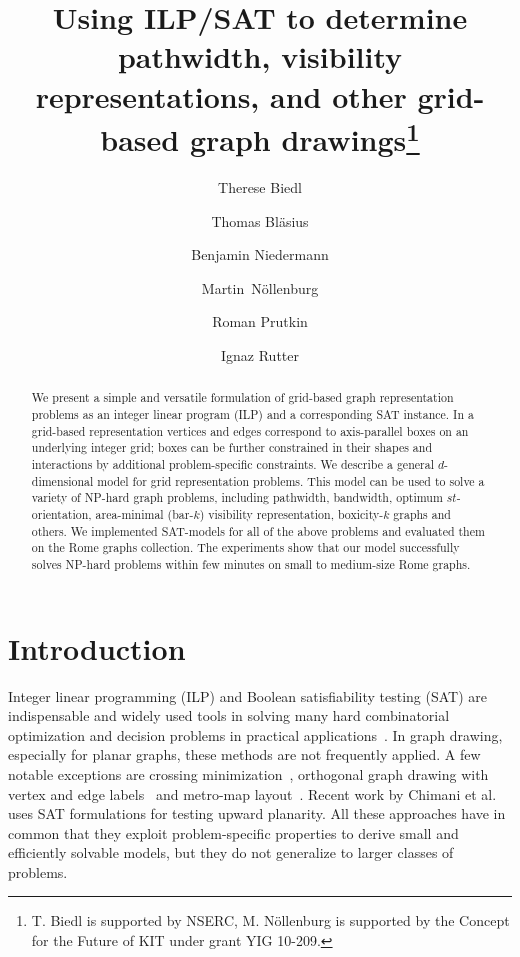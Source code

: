\documentclass[runningheads]{llncs}
\title{Using ILP/SAT to determine pathwidth, visibility
representations, and other grid-based graph drawings\thanks{T. Biedl
is supported
by NSERC, M. Nöllenburg is supported by the Concept for the Future of
KIT under grant YIG 10-209.}}
\author{Therese Biedl\inst{1}
\and Thomas Bl\"asius\inst{2}
\and Benjamin Niedermann\inst{2}\and Martin~N\"{o}llenburg\inst{2}\and Roman Prutkin\inst{2}\and Ignaz Rutter\inst{2}}
\institute{David R.~Cheriton School of Computer
Science, University of Waterloo, Canada
\and
Institute of Theoretical Informatics, Karlsruhe Institute of
Technology, Germany
}
\newcounter{constr}
\begin{document}
\maketitle
\begin{abstract}
We present a simple and versatile formulation of grid-based graph
representation problems as an integer linear program (ILP) and a
corresponding SAT instance. In a grid-based representation vertices
and edges correspond to axis-parallel boxes on an underlying integer
grid; boxes can be further constrained in their shapes and
interactions by additional problem-specific constraints. We describe a
general $d$-dimensional model for grid representation problems. This
model can be used to solve a variety of  NP-hard graph problems,
including pathwidth, bandwidth, optimum $st$-orientation, 
area-minimal (bar-$k$) visibility representation, boxicity-$k$ graphs
and others. We implemented SAT-models for all of the above problems
and evaluated them on the Rome graphs collection. The experiments show
that our model successfully solves NP-hard problems within few minutes
on small to medium-size Rome graphs.
\end{abstract}

\section{Introduction}
Integer linear programming (ILP) and Boolean satisfiability testing
(SAT) are indispensable and widely used tools in solving many hard
combinatorial optimization and decision problems in practical
applications~\cite{bhmw-hs-09,cbd-aip-10}. In graph drawing,
especially for planar graphs, these methods are not frequently
applied. A few notable exceptions
are crossing
minimization~\cite{cmb-aecm-08,bcegjk-bacnp-08,jm-2scmpeha-97,gsm-okpcm-11}, orthogonal graph drawing with vertex and
edge labels~\cite{bdln-odgwvel-05} and metro-map
layout~\cite{nw-dlhqm-11}. Recent work by Chimani et
al.~\cite{cz-upt-13} uses SAT formulations for testing upward
planarity. All these approaches have in common that they exploit
problem-specific properties to derive small and efficiently solvable
models, but they do not generalize to larger classes of problems. 
\end{document}
